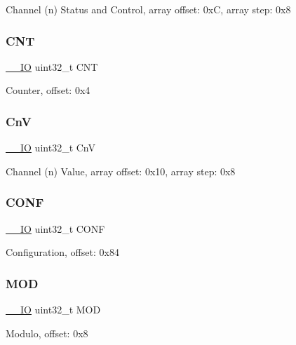 Channel (n) Status and Control, array offset\+: 0xC, array step\+: 0x8 \mbox{\label{struct_t_p_m___type_a6095a27d764d06750fc0d642e08f8b2a}} 
\subsubsection{\texorpdfstring{CNT}{CNT}}
{\footnotesize\ttfamily \mbox{\hyperlink{core__cm0plus_8h_aec43007d9998a0a0e01faede4133d6be}{\+\_\+\+\_\+\+IO}} uint32\+\_\+t C\+NT}

Counter, offset\+: 0x4 \mbox{\label{struct_t_p_m___type_abbc17ee9708ecdd4ddc9cb9e528bdbac}} 
\subsubsection{\texorpdfstring{CnV}{CnV}}
{\footnotesize\ttfamily \mbox{\hyperlink{core__cm0plus_8h_aec43007d9998a0a0e01faede4133d6be}{\+\_\+\+\_\+\+IO}} uint32\+\_\+t CnV}

Channel (n) Value, array offset\+: 0x10, array step\+: 0x8 \mbox{\label{struct_t_p_m___type_a42f5a13cd52a3f76b0b20e3e7cb441b4}} 
\subsubsection{\texorpdfstring{CONF}{CONF}}
{\footnotesize\ttfamily \mbox{\hyperlink{core__cm0plus_8h_aec43007d9998a0a0e01faede4133d6be}{\+\_\+\+\_\+\+IO}} uint32\+\_\+t C\+O\+NF}

Configuration, offset\+: 0x84 \mbox{\label{struct_t_p_m___type_aa35a6713b1e2aafa0749f986730795cb}} 
\subsubsection{\texorpdfstring{MOD}{MOD}}
{\footnotesize\ttfamily \mbox{\hyperlink{core__cm0plus_8h_aec43007d9998a0a0e01faede4133d6be}{\+\_\+\+\_\+\+IO}} uint32\+\_\+t M\+OD}

Modulo, offset\+: 0x8 \mbox{\label{struct_t_p_m___type_a9037a11797290aef4ac48048c07e2e89}} 
